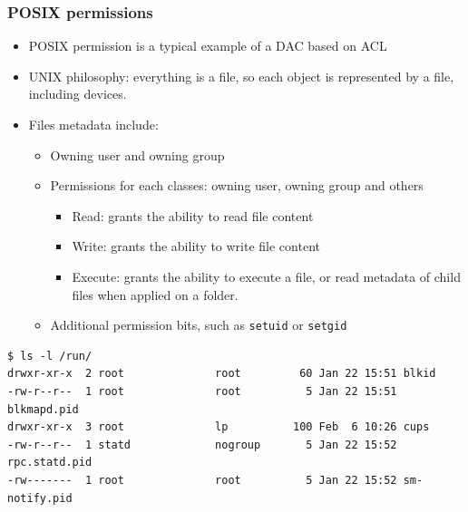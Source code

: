 \begin{frame}[fragile]
	\frametitle{POSIX permissions}
	\begin{itemize}
		\item POSIX permission is a typical example of a DAC based on ACL
		\item UNIX philosophy: everything is a file, so each object is represented
			by a file, including devices.
		\item Files metadata include:
			\begin{itemize}
				\item Owning user and owning group
				\item Permissions for each classes: owning user, owning group and others
					\begin{itemize}
						\item Read: grants the ability to read file content
						\item Write: grants the ability to write file content
						\item Execute: grants the ability to execute a file, or read
							metadata of child files when applied on a folder.
					\end{itemize}
				\item Additional permission bits, such as \texttt{setuid} or
					\texttt{setgid}
			\end{itemize}
	\end{itemize}
	\begin{block}{}
		{\tiny
		\begin{verbatim}
$ ls -l /run/
drwxr-xr-x  2 root              root         60 Jan 22 15:51 blkid
-rw-r--r--  1 root              root          5 Jan 22 15:51 blkmapd.pid
drwxr-xr-x  3 root              lp          100 Feb  6 10:26 cups
-rw-r--r--  1 statd             nogroup       5 Jan 22 15:52 rpc.statd.pid
-rw-------  1 root              root          5 Jan 22 15:52 sm-notify.pid
\end{verbatim}
		}
	\end{block}
\end{frame}

